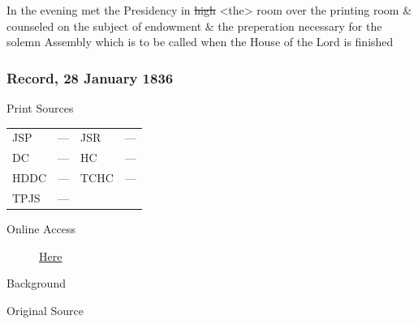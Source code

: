 					In the evening met the Presidency in \sout{high} <the> room over the printing room \& counseled on the subject of endowment \& the preperation necessary for the solemn Assembly which is to be called when the House of the Lord is finished
					
		\subsubsection{Record, 28 January 1836}
			\label{EMS-1836-JS-28-JAN-1836}
			
			\begin{description}
					\item[Print Sources]
				\end{description}

					\begin{tabular}{p{0.5in}p{1in}p{0.5in}p{1in}}
					JSP	 	& ---		& JSR 		& --- \\
					DC	 	& ---		& HC 		& --- \\
					HDDC 	& ---		& TCHC 		& --- \\
					TPJS 	& ---		& 	 		&  \\
					\end{tabular}
				
				\begin{description}
					\item[Online Access] \href{https://www.josephsmithpapers.org/paper-summary/journal-1835-1836/144}{Here}
				\end{description}
				
				\begin{description}
					\item[Background]
				\end{description}
				
				
				\begin{description}
					\item[Original Source]
				\end{description}
				
